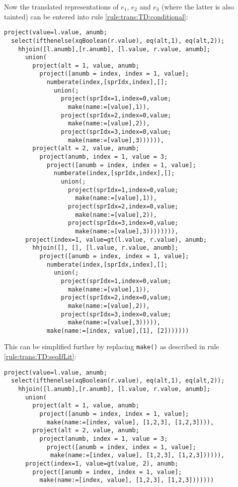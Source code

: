 Now the translated representations of $e_1$, $e_2$ and $e_3$ (where the latter
is also tainted) can be entered into rule \ref{rule:trans:TD:conditional}:

\begin{Verbatim}
project(value=l.value, anumb;
  select(ifthenelse(xqBoolean(r.value), eq(alt,1), eq(alt,2));
    hhjoin([l.anumb],[r.anumb], [l.value, r.value, anumb];
      union(
        project(alt = 1, value, anumb;
          project([anumb = index, index = 1, value];
            numberate(index,[sprIdx,index],[];
              union(;
                project(sprIdx=1,index=0,value;
                  make(name:=[value],1)),
                project(sprIdx=2,index=0,value;
                  make(name:=[value],2)),
                project(sprIdx=3,index=0,value;
                  make(name:=[value],3)))))),
        project(alt = 2, value, anumb;
          project(anumb, index = 1, value = 3;
            project([anumb = index, index = 1, value];
              numberate(index,[sprIdx,index],[];
                union(;
                  project(sprIdx=1,index=0,value;
                    make(name:=[value],1)),
                  project(sprIdx=2,index=0,value;
                    make(name:=[value],2)),
                  project(sprIdx=3,index=0,value;
                    make(name:=[value],3)))))))),
      project(index=1, value=gt(l.value, r.value), anumb;
        hhjoin([], [], [l.value, r.value, anumb];
          project([anumb = index, index = 1, value];
            numberate(index,[sprIdx,index],[];
              union(;
                project(sprIdx=1,index=0,value;
                  make(name:=[value],1)),
                project(sprIdx=2,index=0,value;
                  make(name:=[value],2)),
                project(sprIdx=3,index=0,value;
                  make(name:=[value],3))))),
            make(name:=[index, value],[1], [2]))))))
\end{Verbatim}

This can be simplified further by replacing \texttt{make()} as described in rule \ref{rule:trans:TD:seqIfLit}: 

\begin{Verbatim}
project(value=l.value, anumb;
  select(ifthenelse(xqBoolean(r.value), eq(alt,1), eq(alt,2));
    hhjoin([l.anumb],[r.anumb], [l.value, r.value, anumb];
      union(
        project(alt = 1, value, anumb;
          project([anumb = index, index = 1, value];
            make(name:=[index, value], [1,2,3], [1,2,3]))),
        project(alt = 2, value, anumb;
          project(anumb, index = 1, value = 3;
            project([anumb = index, index = 1, value];
             make(name:=[index, value], [1,2,3], [1,2,3]))))),
      project(index=1, value=gt(value, 2), anumb;
        project([anumb = index, index = 1, value];
          make(name:=[index, value], [1,2,3], [1,2,3]))))))
\end{Verbatim}

